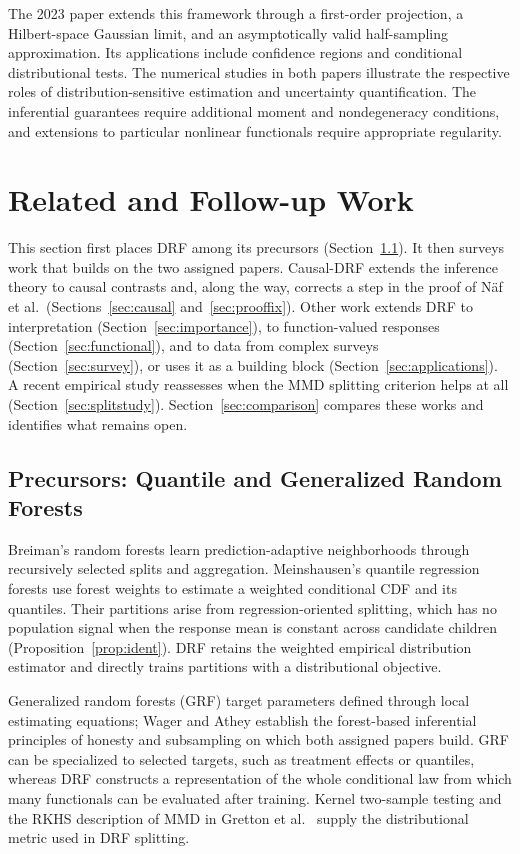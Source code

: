 \documentclass[12pt,a4paper]{article}
\newcommand{\1}{\mathbf 1}
\begin{document}
The 2023 paper extends this framework through a first-order projection, a Hilbert-space Gaussian limit, and an asymptotically valid half-sampling approximation. Its applications include confidence regions and conditional distributional tests. The numerical studies in both papers illustrate the respective roles of distribution-sensitive estimation and uncertainty quantification. The inferential guarantees require additional moment and nondegeneracy conditions, and extensions to particular nonlinear functionals require appropriate regularity.

\section{Related and Follow-up Work}\label{sec:related}
This section first places DRF among its precursors (Section~\ref{sec:precursors}). It then surveys work that builds on the two assigned papers. Causal-DRF extends the inference theory to causal contrasts and, along the way, corrects a step in the proof of N\"af et al.\ (Sections~\ref{sec:causal} and~\ref{sec:prooffix}). Other work extends DRF to interpretation (Section~\ref{sec:importance}), to function-valued responses (Section~\ref{sec:functional}), and to data from complex surveys (Section~\ref{sec:survey}), or uses it as a building block (Section~\ref{sec:applications}). A recent empirical study reassesses when the MMD splitting criterion helps at all (Section~\ref{sec:splitstudy}). Section~\ref{sec:comparison} compares these works and identifies what remains open.

\subsection{Precursors: Quantile and Generalized Random Forests}\label{sec:precursors}
Breiman's random forests \cite{breiman2001} learn prediction-adaptive neighborhoods through recursively selected splits and aggregation. Meinshausen's quantile regression forests \cite{meinshausen2006} use forest weights to estimate a weighted conditional CDF and its quantiles. Their partitions arise from regression-oriented splitting, which has no population signal when the response mean is constant across candidate children (Proposition~\ref{prop:ident}). DRF retains the weighted empirical distribution estimator and directly trains partitions with a distributional objective.

Generalized random forests (GRF) \cite{athey2019} target parameters defined through local estimating equations; Wager and Athey \cite{wagerathey2018} establish the forest-based inferential principles of honesty and subsampling on which both assigned papers build. GRF can be specialized to selected targets, such as treatment effects or quantiles, whereas DRF constructs a representation of the whole conditional law from which many functionals can be evaluated after training. Kernel two-sample testing and the RKHS description of MMD in Gretton et al.\ \cite{gretton2012} supply the distributional metric used in DRF splitting.
\end{document}
